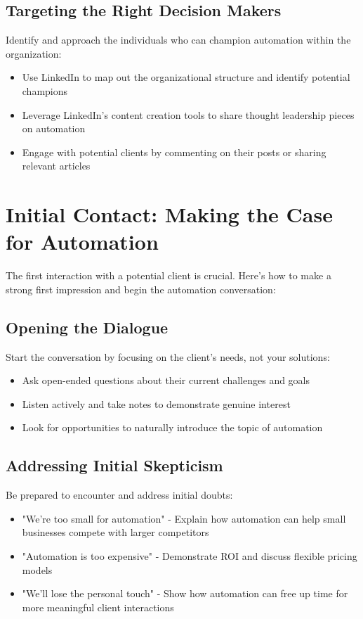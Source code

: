 \subsection{Targeting the Right Decision Makers}

Identify and approach the individuals who can champion automation within the organization:

\begin{itemize}
    \item Use LinkedIn to map out the organizational structure and identify potential champions
    \item Leverage LinkedIn's content creation tools to share thought leadership pieces on automation
    \item Engage with potential clients by commenting on their posts or sharing relevant articles
\end{itemize}


\section{Initial Contact: Making the Case for Automation}

The first interaction with a potential client is crucial. Here's how to make a strong first impression and begin the automation conversation:

\subsection{Opening the Dialogue}

Start the conversation by focusing on the client's needs, not your solutions:

\begin{itemize}
    \item Ask open-ended questions about their current challenges and goals
    \item Listen actively and take notes to demonstrate genuine interest
    \item Look for opportunities to naturally introduce the topic of automation
\end{itemize}

\subsection{Addressing Initial Skepticism}

Be prepared to encounter and address initial doubts:

\begin{itemize}
    \item "We're too small for automation" - Explain how automation can help small businesses compete with larger competitors
    \item "Automation is too expensive" - Demonstrate ROI and discuss flexible pricing models
    \item "We'll lose the personal touch" - Show how automation can free up time for more meaningful client interactions
\end{itemize}

